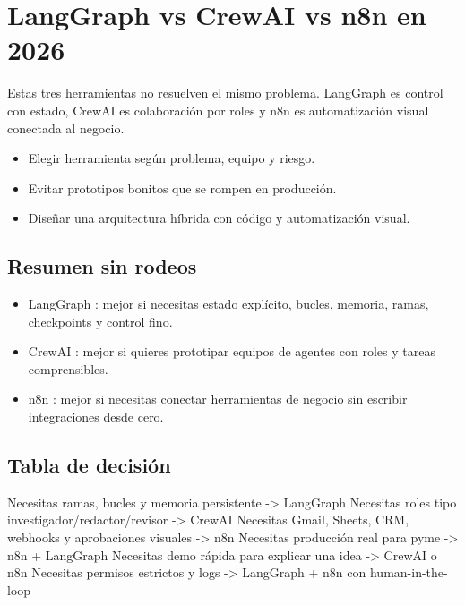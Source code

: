 \documentclass[11pt,a4paper]{book}
\begin{document}
\chapter{LangGraph vs CrewAI vs n8n en 2026}
Estas tres herramientas no resuelven el mismo problema. LangGraph es control con estado, CrewAI es colaboración por roles y n8n es automatización visual conectada al negocio.

\begin{itemize}\item Elegir herramienta según problema, equipo y riesgo.\end{itemize}
\begin{itemize}\item Evitar prototipos bonitos que se rompen en producción.\end{itemize}
\begin{itemize}\item Diseñar una arquitectura híbrida con código y automatización visual.\end{itemize}
\section{Resumen sin rodeos}
\begin{itemize}\item LangGraph : mejor si necesitas estado explícito, bucles, memoria, ramas, checkpoints y control fino.\end{itemize}
\begin{itemize}\item CrewAI : mejor si quieres prototipar equipos de agentes con roles y tareas comprensibles.\end{itemize}
\begin{itemize}\item n8n : mejor si necesitas conectar herramientas de negocio sin escribir integraciones desde cero.\end{itemize}
\section{Tabla de decisión}
\begin{codebox}
Necesitas ramas, bucles y memoria persistente -> LangGraph
Necesitas roles tipo investigador/redactor/revisor -> CrewAI
Necesitas Gmail, Sheets, CRM, webhooks y aprobaciones visuales -> n8n
Necesitas producción real para pyme -> n8n + LangGraph
Necesitas demo rápida para explicar una idea -> CrewAI o n8n
Necesitas permisos estrictos y logs -> LangGraph + n8n con human-in-the-loop
\end{codebox}
\end{document}
